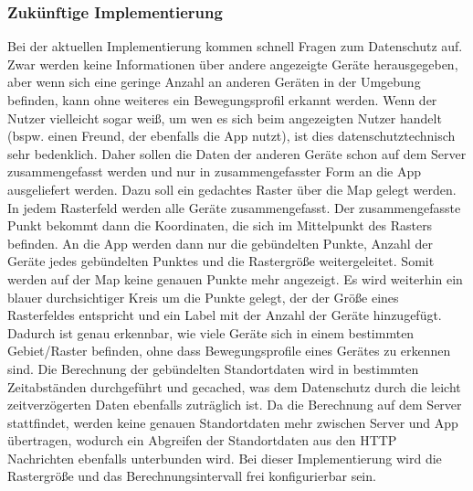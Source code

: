 \subsubsection{Zukünftige Implementierung}\label{subsubsec:mapFutureImpl}
Bei der aktuellen Implementierung kommen schnell Fragen zum Datenschutz auf. Zwar werden keine Informationen über andere angezeigte Geräte herausgegeben, aber wenn sich eine geringe Anzahl an anderen Geräten in der Umgebung befinden, kann ohne weiteres ein Bewegungsprofil erkannt werden. Wenn der Nutzer vielleicht sogar weiß, um wen es sich beim angezeigten Nutzer handelt (bspw. einen Freund, der ebenfalls die App nutzt), ist dies datenschutztechnisch sehr bedenklich. Daher sollen die Daten der anderen Geräte schon auf dem Server zusammengefasst werden und nur in zusammengefasster Form an die App ausgeliefert werden. Dazu soll ein gedachtes Raster über die Map gelegt werden. In jedem Rasterfeld werden alle Geräte zusammengefasst. Der zusammengefasste Punkt bekommt dann die Koordinaten, die sich im Mittelpunkt des Rasters befinden. An die App werden dann nur die gebündelten Punkte, Anzahl der Geräte jedes gebündelten Punktes und die Rastergröße weitergeleitet. Somit werden auf der Map keine genauen Punkte mehr angezeigt. Es wird weiterhin ein blauer durchsichtiger Kreis um die Punkte gelegt, der der Größe eines Rasterfeldes entspricht und ein Label mit der Anzahl der Geräte hinzugefügt. Dadurch ist genau erkennbar, wie viele Geräte sich in einem bestimmten Gebiet/Raster befinden, ohne dass Bewegungsprofile eines Gerätes zu erkennen sind. Die Berechnung der gebündelten Standortdaten wird in bestimmten Zeitabständen durchgeführt und gecached, was dem Datenschutz durch die leicht zeitverzögerten Daten ebenfalls zuträglich ist. Da die Berechnung auf dem Server stattfindet, werden keine genauen Standortdaten mehr zwischen Server und App übertragen, wodurch ein Abgreifen der Standortdaten aus den HTTP Nachrichten ebenfalls unterbunden wird. Bei dieser Implementierung wird die Rastergröße und das Berechnungsintervall frei konfigurierbar sein.
